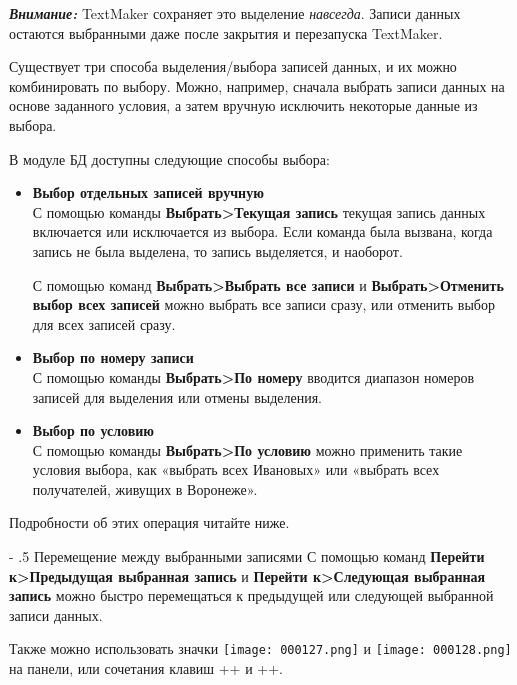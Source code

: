 ﻿\documentclass[a4paper,10pt]{article}
\makeatletter
\renewcommand\paragraph{%
   \@startsection{paragraph}{4}{0mm}%
      {-\baselineskip}%
      {.5\baselineskip}%
      {\normalfont\normalsize\bfseries}}
\makeatother
\begin{document}
\begin{mdframed}[backgroundcolor=blue!10]
\textbf{\textit{Внимание:}} TextMaker сохраняет это выделение \textit{навсегда}. Записи данных остаются выбранными даже после закрытия и перезапуска TextMaker.
\end{mdframed}

Существует три способа выделения/выбора записей данных, и их можно комбинировать по выбору. Можно, например, сначала выбрать записи данных на основе заданного условия, а затем вручную исключить некоторые данные из выбора.

В модуле БД доступны следующие способы выбора:

\begin{itemize}
 \item \textbf{Выбор отдельных записей вручную}\\
 С помощью команды \textbf{Выбрать>Текущая запись} текущая запись данных включается или исключается из выбора. Если команда была вызвана, когда запись не была выделена, то запись выделяется, и наоборот.
 
 С помощью команд \textbf{Выбрать>Выбрать все записи} и \textbf{Выбрать>Отменить выбор всех записей} можно выбрать все записи сразу, или отменить выбор для всех записей сразу.
 \item \textbf{Выбор по номеру записи}\\
 С помощью команды \textbf{Выбрать>По номеру} вводится диапазон номеров записей для выделения или отмены выделения.
 \item \textbf{Выбор по условию}\\
 С помощью команды \textbf{Выбрать>По условию} можно применить такие условия выбора, как «выбрать всех Ивановых» или «выбрать всех получателей, живущих в Воронеже».
\end{itemize}

Подробности об этих операция читайте ниже.

\paragraph{Перемещение между выбранными записями}
С помощью команд \textbf{Перейти к>Предыдущая выбранная запись} и \textbf{Перейти к>Следующая выбранная запись} можно быстро перемещаться к предыдущей или следующей выбранной записи данных.

Также можно использовать значки \texttt{[image: 000127.png]} и \texttt{[image: 000128.png]} на панели, или сочетания клавиш ++\keys{\arrowkeyup} и ++\keys{\arrowkeydown}.
\end{document}
